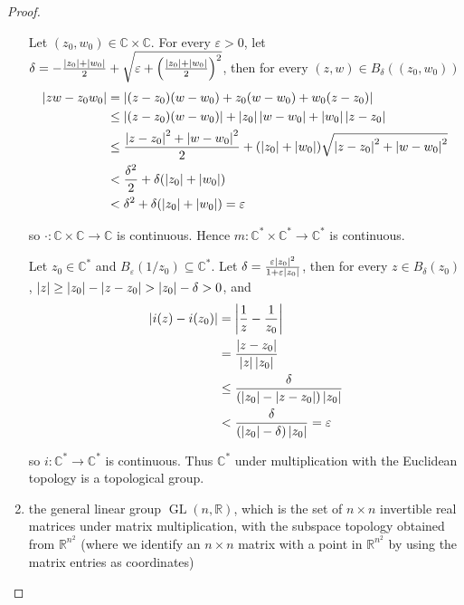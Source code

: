 \begin{proof}
\begin{enumerate}[label={(\alph*)}]
		      Let $(z_{0}, w_{0})\in \mathbb{C}\times\mathbb{C}$. For every $\varepsilon > 0$, let $\delta = -\frac{\left\vert{z_{0}}\right\vert + \left\vert{w_{0}}\right\vert}{2} + \sqrt{\varepsilon + {\left(\frac{\left\vert{z_{0}}\right\vert + \left\vert{w_{0}}\right\vert}{2}\right)}^{2}}$, then for every $(z, w)\in B_{\delta}((z_{0}, w_{0}))$
		      \begin{align*}
			      \left\vert{zw - z_{0}w_{0}}\right\vert & = \left\vert{(z - z_{0})(w - w_{0}) + z_{0}(w - w_{0}) + w_{0}(z - z_{0})}\right\vert                                                                   \\
			                            & \leq \left\vert{(z - z_{0})(w - w_{0})}\right\vert + \left\vert{z_{0}}\right\vert\left\vert{w - w_{0}}\right\vert + \left\vert{w_{0}}\right\vert\left\vert{z - z_{0}}\right\vert                                            \\
			                            & \leq \frac{\left\vert{z - z_{0}}\right\vert^{2} + \left\vert{w - w_{0}}\right\vert^{2}}{2} + (\left\vert{z_{0}}\right\vert + \left\vert{w_{0}}\right\vert)\sqrt{\left\vert{z - z_{0}}\right\vert^{2} + \left\vert{w - w_{0}}\right\vert^{2}} \\
			                            & < \frac{\delta^{2}}{2} + \delta(\left\vert{z_{0}}\right\vert + \left\vert{w_{0}}\right\vert)                                                                             \\
			                            & < \delta^{2} + \delta(\left\vert{z_{0}}\right\vert + \left\vert{w_{0}}\right\vert) = \varepsilon
		      \end{align*}

		      so $\cdot: \mathbb{C}\times\mathbb{C}\to\mathbb{C}$ is continuous. Hence $m: \mathbb{C}^{*}\times\mathbb{C}^{*}\to \mathbb{C}^{*}$ is continuous.

		      Let $z_{0}\in\mathbb{C}^{*}$ and $B_{\varepsilon}(1/z_{0})\subseteq \mathbb{C}^{*}$. Let $\delta = \frac{\varepsilon\left\vert{z_{0}}\right\vert^{2}}{1 + \varepsilon\left\vert{z_{0}}\right\vert}$, then for every $z\in B_{\delta}(z_{0})$, $\left\vert{z}\right\vert\geq \left\vert{z_{0}}\right\vert - \left\vert{z - z_{0}}\right\vert > \left\vert{z_{0}}\right\vert - \delta > 0$, and
		      \begin{align*}
			      \left\vert{i(z) - i(z_{0})}\right\vert & = \left\vert{\frac{1}{z} - \frac{1}{z_{0}}}\right\vert                            \\
			                            & = \frac{\left\vert{z - z_{0}}\right\vert}{\left\vert{z}\right\vert\left\vert{z_{0}}\right\vert}                     \\
			                            & \leq \frac{\delta}{(\left\vert{z_{0}}\right\vert - \left\vert{z - z_{0}}\right\vert)\left\vert{z_{0}}\right\vert}   \\
			                            & < \frac{\delta}{(\left\vert{z_{0}}\right\vert - \delta)\left\vert{z_{0}}\right\vert} = \varepsilon
		      \end{align*}

		      so $i: \mathbb{C}^{*}\to \mathbb{C}^{*}$ is continuous. Thus $\mathbb{C}^{*}$ under multiplication with the Euclidean topology is a topological group.
		\item the general linear group $\operatorname{GL}(n, \mathbb{R})$, which is the set of $n\times n$ invertible real matrices under matrix multiplication, with the subspace topology obtained from $\mathbb{R}^{n^{2}}$ (where we identify an $n\times n$ matrix with a point in $\mathbb{R}^{n^{2}}$ by using the matrix entries as coordinates)


\end{enumerate}
\end{proof}
